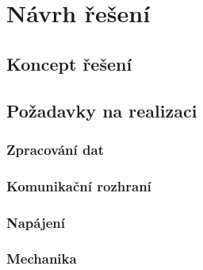 \chapter{Návrh řešení}
\section{Koncept řešení}
\section{Požadavky na realizaci}		%
\subsection{Zpracování dat}
\subsection{Komunikační rozhraní}
\subsection{Napájení}
\subsection{Mechanika}